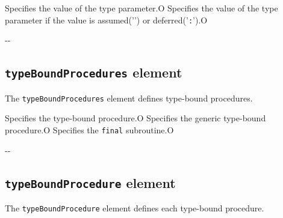 \begin{XcodeMLChildElements}
{Specifies the value of the type parameter.}{O}
{Specifies the value of the type parameter if the value is assumed('{\tt *}') or deferred('{\tt :}').}{O}
\end{XcodeMLChildElements}

\begin{XcodeMLAttributes}
\XcodeMLAttrDef{-}{-}
{-}{-}
\end{XcodeMLAttributes}


\subsection{ {\tt typeBoundProcedures} element}

The {\tt typeBoundProcedures} element defines type-bound procedures.


\begin{XcodeMLChildElements}
{Specifies the type-bound procedure.}{O}
{Specifies the generic type-bound procedure.}{O}
{Specifies the {\tt final} subroutine.}{O}
\end{XcodeMLChildElements}

\begin{XcodeMLAttributes}
\XcodeMLAttrDef{-}{-}
{-}{-}
\end{XcodeMLAttributes}


\subsection{ {\tt typeBoundProcedure} element}

The {\tt typeBoundProcedure} element defines each type-bound procedure.


